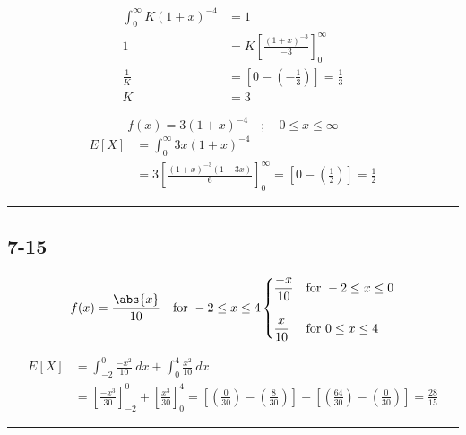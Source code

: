 \documentclass{article}
\newcommand{\qline}{\par\noindent\rule{4.5in}{1pt}}
\begin{document}
			\begin{equation*}
				\begin{split}
					\int_{0}^{\infty} K \left( 1 + x \right)^{-4} &= 1 \\
					1 &= K \left[ \frac{(1 + x)^{-3}}{-3} \right]^{\infty}_0 \\
					\frac{1}{K} &= \left[ 0 -  \left(-\frac{1}{3}\right) \right] = \frac{1}{3} \\
					K &= 3
				\end{split}
			\end{equation*}

			\[
				f(x) = 3 \left( 1 + x \right)^{-4} \quad ; \quad 0 \leq x \leq \infty
			\]
			\begin{equation*}
				\begin{split}
					E\left[X\right] &= \int_{0}^{\infty} 3x\left( 1 + x \right)^{-4} \\
					&= 3 \left[ \frac{(1 + x)^{-3} (1-3x)}{6} \right]^{\infty}_0 = \left[ 0 - \left( \frac{1}{2} \right) \right] = \boxed{\frac{1}{2}}
				\end{split}
			\end{equation*}

	\qline

		\subsection*{7-15}

			\[
				f(x) = \frac{\abs{x}}{10} \quad \text{for } -2 \leq x \leq 4
				\begin{cases}
					\dfrac{-x}{10}  &  \text{for } -2 \leq x \leq 0 \\
					\\
					\dfrac{x}{10}   &  \text{for } 0  \leq x \leq 4
				\end{cases}
			\]

			\begin{equation*}
				\begin{split}
					E\left[X\right] &= \int_{-2}^{0} \frac{-x^2}{10} \ dx + \int_{0}^{4} \frac{x^2}{10} \ dx \\
					&= \left[ \frac{-x^3}{30} \right]^0_{-2} + \left[ \frac{x^3}{30} \right]^4_{0} = \left[ \left( \frac{0}{30} \right) - \left( \frac{8}{30} \right) \right] + \left[ \left( \frac{64}{30} \right) - \left( \frac{0}{30} \right) \right] = \boxed{\frac{28}{15}}
				\end{split}
			\end{equation*}

	\qline
\end{document}
